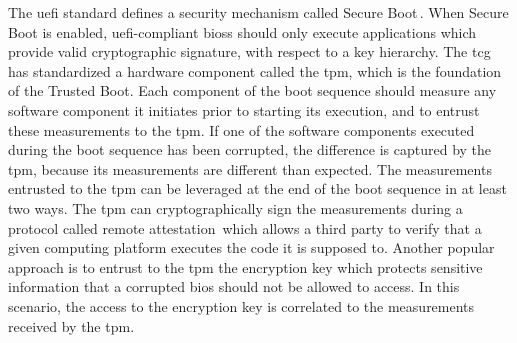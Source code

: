 %
The \ac{uefi} standard defines a security mechanism called Secure
Boot\,\cite{rosenbaum2012secboot}.
%
When Secure Boot is enabled, \ac{uefi}-compliant \acp{bios} should only execute
applications which provide valid cryptographic signature, with respect
to a key hierarchy. 
%
The \ac{tcg} has standardized a hardware component called the \ac{tpm}, which is
the foundation of the Trusted Boot. 
%
Each component of the boot sequence should measure any software component it
initiates prior to starting its execution, and to entrust these measurements to
the \ac{tpm}.
%
If one of the software components executed during the boot sequence has been
corrupted, the difference is captured by the \ac{tpm}, because its measurements
are different than expected. 
%
The measurements entrusted to the \ac{tpm} can be leveraged at the end of the
boot sequence in at least two ways.
%
The \ac{tpm} can cryptographically sign the measurements during a protocol
called remote attestation\,\cite{coker2011remoteattestation} which allows a
third party to verify that a given computing platform executes the code it is
supposed to.
%
Another popular approach is to entrust to the \ac{tpm} the encryption key which
protects sensitive information that a corrupted \ac{bios} should not be allowed
to access.
%
In this scenario, the access to the encryption key is correlated to the
measurements received by the \ac{tpm}.


